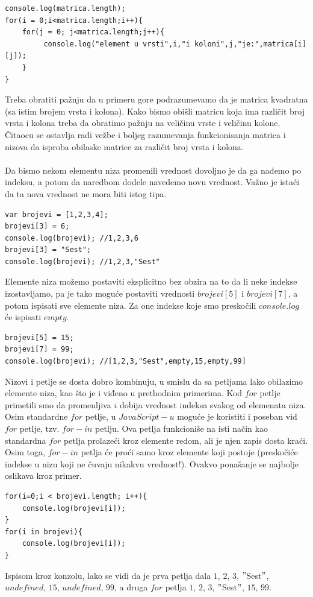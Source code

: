 \documentclass[a4paper]{article}
\begin{document}
\begin{lstlisting}[backgroundcolor = \color{lightgray}]
console.log(matrica.length);
for(i = 0;i<matrica.length;i++){
    for(j = 0; j<matrica.length;j++){
         console.log("element u vrsti",i,"i koloni",j,"je:",matrica[i][j]);
    }
}
\end{lstlisting}
Treba obratiti pažnju da u primeru gore podrazumevamo da je matrica kvadratna (sa istim brojem vrsta i kolona). Kako bismo obišli matricu koja ima različit broj vrsta i kolona treba da obratimo pažnju na veličinu vrste i veličinu kolone. Čitaocu se ostavlja radi vežbe i boljeg razumevanja funkcionisanja matrica i nizova da isproba obilaske matrice za različit broj vrsta i kolona.\\\\
Da bismo nekom elementu niza promenili vrednost dovoljno je da ga nađemo po indeksu, a potom da naredbom dodele navedemo novu vrednost. Važno je istaći da ta nova vrednost ne mora biti istog tipa.
\begin{lstlisting}[backgroundcolor = \color{lightgray}]
var brojevi = [1,2,3,4];
brojevi[3] = 6;
console.log(brojevi); //1,2,3,6
brojevi[3] = "Sest";
console.log(brojevi); //1,2,3,"Sest"
\end{lstlisting}

Elemente niza možemo postaviti eksplicitno bez obzira na to da li neke indekse izostavljamo, pa je tako moguće postaviti vrednosti $brojevi[5]$ i $brojevi[7]$, a potom ispisati sve elemente niza. Za one indekse koje smo preskočili $console.log$ će ispisati $empty$.

\begin{lstlisting}[backgroundcolor = \color{lightgray}]
brojevi[5] = 15;
brojevi[7] = 99;
console.log(brojevi); //[1,2,3,"Sest",empty,15,empty,99]
\end{lstlisting}

Nizovi i petlje se dosta dobro kombinuju, u smislu da sa petljama lako obilazimo elemente niza, kao što je i viđeno u prethodnim primerima. Kod $for$ petlje primetili smo da promenljiva $i$ dobija vrednost indeksa svakog od elemenata niza. Osim standardne $for$ petlje, u $JavaScript-u$ moguće je koristiti i poseban vid $for$ petlje, tzv. $for-in$ petlju. Ova petlja funkcioniše na isti način kao standardna $for$ petlja prolazeći kroz elemente redom, ali je njen zapis dosta kraći. Osim toga, $for-in$ petlja će proći samo kroz elemente koji postoje (preskočiće indekse u nizu koji ne čuvaju nikakvu vrednost!). Ovakvo ponašanje se najbolje oslikava kroz primer.
\begin{lstlisting}[backgroundcolor = \color{lightgray}]
for(i=0;i < brojevi.length; i++){
	console.log(brojevi[i]); 
}
for(i in brojevi){
	console.log(brojevi[i]);
}
\end{lstlisting}
Ispisom kroz konzolu, lako se vidi da je prva petlja dala $1$, $2$, $3$, $"$Sest$"$, $undefined$, $15$, $undefined$, $99$, a druga $for$ petlja $1$, $2$, $3$, $"$Sest$"$, $15$, $99$. 
 
\end{document}

